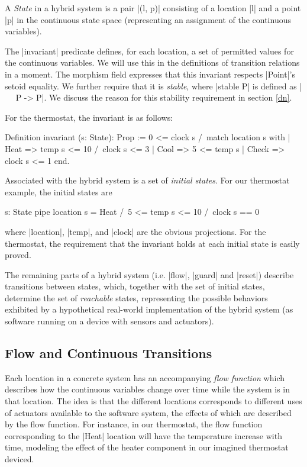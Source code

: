 \documentclass[runningheads]{llncs}
\begin{document}
A \emph{State} in a hybrid system is a pair |(l, p)| consisting of a location |l| and a point |p| in the continuous state space (representing an assignment of the continuous variables).

The |invariant| predicate defines, for each location, a set of permitted values for the continuous variables. We will use this in the definitions of transition relations in a moment. The morphism field expresses that this invariant respects |Point|'s setoid equality. We further require that it is \emph{stable}, where |stable P| is defined as |~ ~P -> P|. We discuss the reason for this stability requirement in section \ref{dn}.

For the thermostat, the invariant is as follows:
\begin{code}
Definition invariant (s: State): Prop :=
  0 <= clock s /\
  match location s with
  | Heat => temp s <= 10 /\ clock s <= 3
  | Cool => 5 <= temp s
  | Check => clock s <= 1
  end.
\end{code}

Associated with the hybrid system is a set of \emph{initial states}. For our thermostat example, the initial states are
\begin{code}
  {s: State pipe location s = Heat /\ 5 <= temp s <= 10 /\ clock s == 0}
\end{code}
where |location|, |temp|, and |clock| are the obvious projections. For the thermostat, the requirement that the invariant holds at each initial state is easily proved.

The remaining parts of a hybrid system (i.e. |flow|, |guard| and |reset|) describe transitions between states, which, together with the set of initial states, determine the set of \emph{reachable} states, representing the possible behaviors exhibited by a hypothetical real-world implementation of the hybrid system (as software running on a device with sensors and actuators).

\subsection{Flow and Continuous Transitions}
\label{concreteflow}

Each location in a concrete system has an accompanying \emph{flow function} which describes how the continuous variables change over time while the system is in that location. The idea is that the different locations corresponds to different uses of actuators available to the software system, the effects of which are described by the flow function. For instance, in our thermostat, the flow function corresponding to the |Heat| location will have the temperature increase with time, modeling the effect of the heater component in our imagined thermostat deviced.
\end{document}
